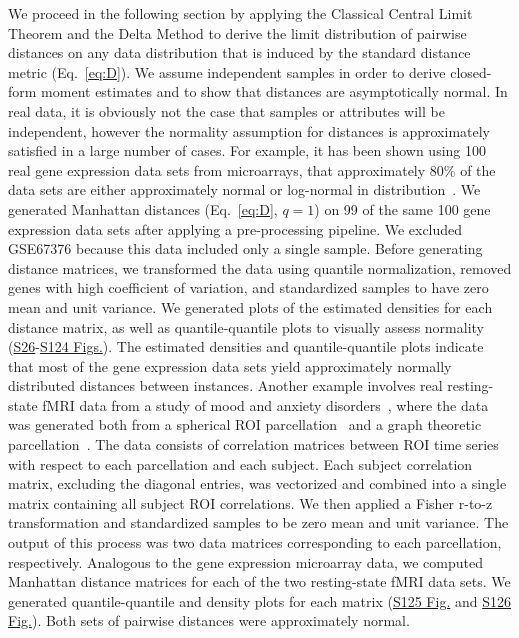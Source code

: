 \documentclass[10pt,letterpaper]{article}
\begin{document}
We proceed in the following section by applying the Classical Central Limit Theorem and the Delta Method to derive the limit distribution of pairwise distances on any data distribution that is induced by the standard distance metric (Eq.~\ref{eq:D}). We assume independent samples in order to derive closed-form moment estimates and to show that distances are asymptotically normal. In real data, it is obviously not the case that samples or attributes will be independent, however the normality assumption for distances is approximately satisfied in a large number of cases. For example, it has been shown using 100 real gene expression data sets from microarrays, that approximately 80\% of the data sets are either approximately normal or log-normal in distribution~\cite{liu2019}. We generated Manhattan distances (Eq.~\ref{eq:D}, $q=1$) on 99 of the same 100 gene expression data sets after applying a pre-processing pipeline. We excluded GSE67376 because this data included only a single sample. Before generating distance matrices, we transformed the data using quantile normalization, removed genes with high coefficient of variation, and standardized samples to have zero mean and unit variance. We generated plots of the estimated densities for each distance matrix, as well as quantile-quantile plots to visually assess normality (\hyperlink{S26_Fig}{S26}-\hyperlink{S124_Fig}{S124 Figs.}). The estimated densities and quantile-quantile plots indicate that most of the gene expression data sets yield approximately normally distributed distances between instances. Another example involves real resting-state fMRI data from a study of mood and anxiety disorders~\cite{t1000}, where the data was generated both from a spherical ROI parcellation~\cite{power2011} and a graph theoretic parcellation~\cite{shen2013}. The data consists of correlation matrices between ROI time series with respect to each parcellation and each subject. Each subject correlation matrix, excluding the diagonal entries, was vectorized and combined into a single matrix containing all subject ROI correlations. We then applied a Fisher r-to-z transformation and standardized samples to be zero mean and unit variance. The output of this process was two data matrices corresponding to each parcellation, respectively. Analogous to the gene expression microarray data, we computed Manhattan distance matrices for each of the two resting-state fMRI data sets. We generated quantile-quantile and density plots for each matrix (\hyperlink{S125_Fig}{S125 Fig.} and \hyperlink{S126_Fig}{S126 Fig.}). Both sets of pairwise distances were approximately normal.
\end{document}
